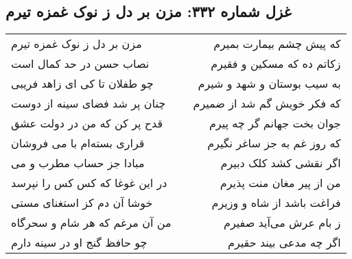 \begin{center}
\section*{غزل شماره ۳۳۲: مزن بر دل ز نوک غمزه تیرم}
\label{sec:sh332}
\begin{longtable}{l p{0.5cm} r}
مزن بر دل ز نوک غمزه تیرم
&&
که پیش چشم بیمارت بمیرم
\\
نصاب حسن در حد کمال است
&&
زکاتم ده که مسکین و فقیرم
\\
چو طفلان تا کی ای زاهد فریبی
&&
به سیب بوستان و شهد و شیرم
\\
چنان پر شد فضای سینه از دوست
&&
که فکر خویش گم شد از ضمیرم
\\
قدح پر کن که من در دولت عشق
&&
جوان بخت جهانم گر چه پیرم
\\
قراری بسته‌ام با می فروشان
&&
که روز غم به جز ساغر نگیرم
\\
مبادا جز حساب مطرب و می
&&
اگر نقشی کشد کلک دبیرم
\\
در این غوغا که کس کس را نپرسد
&&
من از پیر مغان منت پذیرم
\\
خوشا آن دم کز استغنای مستی
&&
فراغت باشد از شاه و وزیرم
\\
من آن مرغم که هر شام و سحرگاه
&&
ز بام عرش می‌آید صفیرم
\\
چو حافظ گنج او در سینه دارم
&&
اگر چه مدعی بیند حقیرم
\\
\end{longtable}
\end{center}
